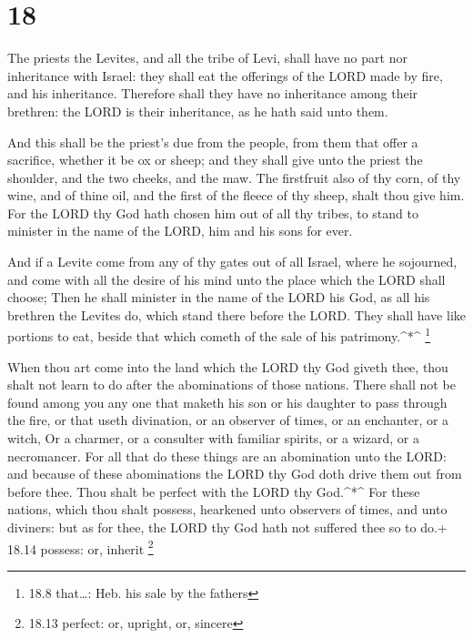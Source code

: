 \hypertarget{section-17}{%
\section{18}\label{section-17}}

 The priests the Levites, and all the tribe of Levi, shall
have no part nor inheritance with Israel: they shall eat the offerings
of the LORD made by fire, and his inheritance.  Therefore
shall they have no inheritance among their brethren: the LORD is their
inheritance, as he hath said unto them.

 And this shall be the priest's due from the people, from
them that offer a sacrifice, whether it be ox or sheep; and they shall
give unto the priest the shoulder, and the two cheeks, and the maw.
 The firstfruit also of thy corn, of thy wine, and of thine
oil, and the first of the fleece of thy sheep, shalt thou give him.
 For the LORD thy God hath chosen him out of all thy tribes,
to stand to minister in the name of the LORD, him and his sons for ever.

 And if a Levite come from any of thy gates out of all
Israel, where he sojourned, and come with all the desire of his mind
unto the place which the LORD shall choose;  Then he shall
minister in the name of the LORD his God, as all his brethren the
Levites do, which stand there before the LORD.  They shall
have like portions to eat, beside that which cometh of the sale of his
patrimony.\^{}*\^{} \footnote{18.8 that\ldots: Heb. his sale by the
  fathers}

 When thou art come into the land which the LORD thy God
giveth thee, thou shalt not learn to do after the abominations of those
nations.  There shall not be found among you any one that
maketh his son or his daughter to pass through the fire, or that useth
divination, or an observer of times, or an enchanter, or a witch,
 Or a charmer, or a consulter with familiar spirits, or a
wizard, or a necromancer.  For all that do these things are
an abomination unto the LORD: and because of these abominations the LORD
thy God doth drive them out from before thee.  Thou shalt
be perfect with the LORD thy God.\^{}*\^{}  For these
nations, which thou shalt possess, hearkened unto observers of times,
and unto diviners: but as for thee, the LORD thy God hath not suffered
thee so to do.+ 18.14 possess: or, inherit \footnote{18.13 perfect: or,
  upright, or, sincere}

